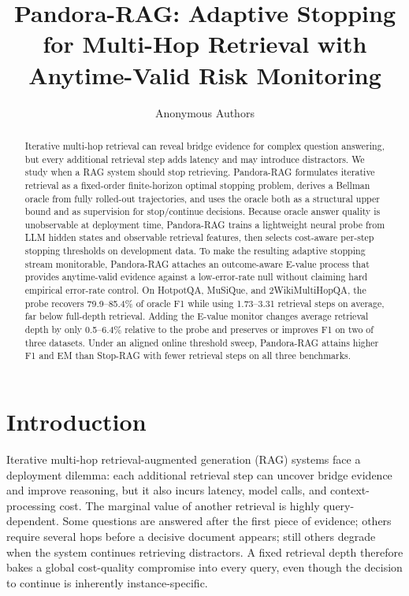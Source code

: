 \documentclass{article}
\title{Pandora-RAG: Adaptive Stopping for Multi-Hop Retrieval with Anytime-Valid Risk Monitoring}
\author{Anonymous Authors}
\newcommand{\method}{Pandora-RAG}
\newcommand{\hotpot}{HotpotQA}
\newcommand{\musique}{MuSiQue}
\newcommand{\twowiki}{2WikiMultiHopQA}
\begin{document}
\maketitle

\begin{abstract}
Iterative multi-hop retrieval can reveal bridge evidence for complex question answering, but every additional retrieval step adds latency and may introduce distractors. We study when a RAG system should stop retrieving. \method{} formulates iterative retrieval as a fixed-order finite-horizon optimal stopping problem, derives a Bellman oracle from fully rolled-out trajectories, and uses the oracle both as a structural upper bound and as supervision for stop/continue decisions. Because oracle answer quality is unobservable at deployment time, \method{} trains a lightweight neural probe from LLM hidden states and observable retrieval features, then selects cost-aware per-step stopping thresholds on development data. To make the resulting adaptive stopping stream monitorable, \method{} attaches an outcome-aware E-value process that provides anytime-valid evidence against a low-error-rate null without claiming hard empirical error-rate control. On \hotpot{}, \musique{}, and \twowiki{}, the probe recovers 79.9--85.4\% of oracle F1 while using 1.73--3.31 retrieval steps on average, far below full-depth retrieval. Adding the E-value monitor changes average retrieval depth by only 0.5--6.4\% relative to the probe and preserves or improves F1 on two of three datasets. Under an aligned online threshold sweep, \method{} attains higher F1 and EM than Stop-RAG with fewer retrieval steps on all three benchmarks.
\end{abstract}

\section{Introduction}

Iterative multi-hop retrieval-augmented generation (RAG) systems face a deployment dilemma: each additional retrieval step can uncover bridge evidence and improve reasoning, but it also incurs latency, model calls, and context-processing cost. The marginal value of another retrieval is highly query-dependent. Some questions are answered after the first piece of evidence; others require several hops before a decisive document appears; still others degrade when the system continues retrieving distractors. A fixed retrieval depth therefore bakes a global cost-quality compromise into every query, even though the decision to continue is inherently instance-specific.
\end{document}
